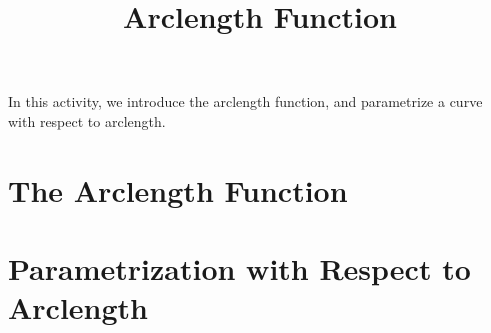 \documentclass{ximera}
\title{Arclength Function}
\begin{document}
\begin{abstract}
\end{abstract}
\maketitle

In this activity, we introduce the arclength function, and parametrize a curve with respect to arclength.

\section{The Arclength Function}

\section{Parametrization with Respect to Arclength}
\end{document}
